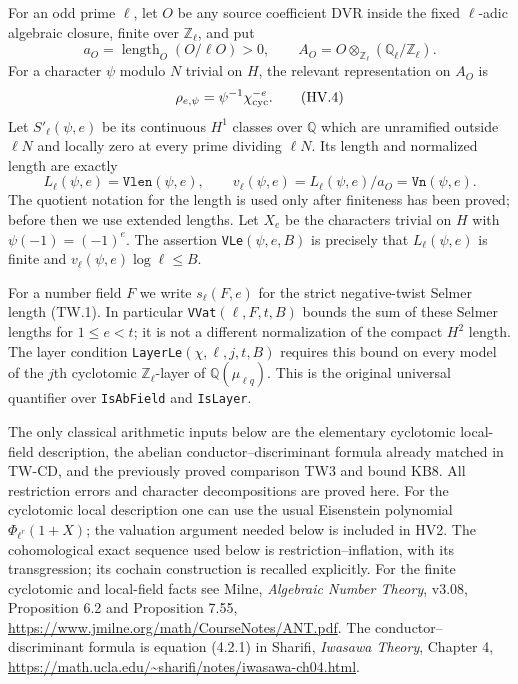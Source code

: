 For an odd prime $\ell$, let $O$ be any source coefficient DVR
inside the fixed $\ell$-adic algebraic closure, finite over
$\mathbb Z_\ell$, and put
\[
 a_O=\operatorname{length}_O(O/\ell O)>0,
 \qquad A_O=O\otimes_{\mathbb Z_\ell}
                         (\mathbb Q_\ell/\mathbb Z_\ell).
 \tag{HV.3}
\]
For a character $\psi$ modulo $N$ trivial on $H$, the relevant
representation on $A_O$ is
\[
                 \rho_{e,\psi}=\psi^{-1}\chi_{\rm cyc}^{-e}.
 \tag{HV.4}
\]
Let $S'_\ell(\psi,e)$ be its continuous $H^1$ classes over
$\mathbb Q$ which are unramified outside $\ell N$ and locally
zero at every prime dividing $\ell N$.  Its length and normalized
length are exactly
\[
 L_\ell(\psi,e)=\mathtt{Vlen}(\psi,e),\qquad
 v_\ell(\psi,e)=L_\ell(\psi,e)/a_O=\mathtt{Vn}(\psi,e).
 \tag{HV.5}
\]
The quotient notation for the length is used only after finiteness
has been proved; before then we use extended lengths.  Let $X_e$
be the characters trivial on $H$ with $\psi(-1)=(-1)^e$.
The assertion \texttt{VLe}$(\psi,e,B)$ is precisely that
$L_\ell(\psi,e)$ is finite and $v_\ell(\psi,e)\log\ell\le B$.

For a number field $F$ we write $s_\ell(F,e)$ for the strict
negative-twist Selmer length (TW.1).  In particular
\texttt{VVat}$(\ell,F,t,B)$ bounds the sum of these Selmer
lengths for $1\le e<t$; it is not a different normalization
of the compact $H^2$ length.  The layer condition
\texttt{LayerLe}$(\chi,\ell,j,t,B)$ requires this bound on
every model of the $j$th cyclotomic $\mathbb Z_\ell$-layer of
$\mathbb Q(\mu_{\ell q})$.  This is the original universal
quantifier over \texttt{IsAbField} and \texttt{IsLayer}.

The only classical arithmetic inputs below are the elementary
cyclotomic local-field description, the abelian
conductor--discriminant formula already matched in TW-CD, and
the previously proved comparison TW3 and bound KB8.  All
restriction errors and character decompositions are proved here.
For the cyclotomic local description one can use the usual
Eisenstein polynomial $\Phi_{\ell^r}(1+X)$; the valuation argument
needed below is included in HV2.  The cohomological exact
sequence used below is restriction--inflation, with its
transgression; its cochain construction is recalled explicitly.
For the finite cyclotomic and local-field facts see Milne,
\emph{Algebraic Number Theory}, v3.08, Proposition 6.2 and
Proposition 7.55,
\url{https://www.jmilne.org/math/CourseNotes/ANT.pdf}.
The conductor--discriminant formula is equation (4.2.1) in
Sharifi, \emph{Iwasawa Theory}, Chapter 4,
\url{https://math.ucla.edu/~sharifi/notes/iwasawa-ch04.html}.

